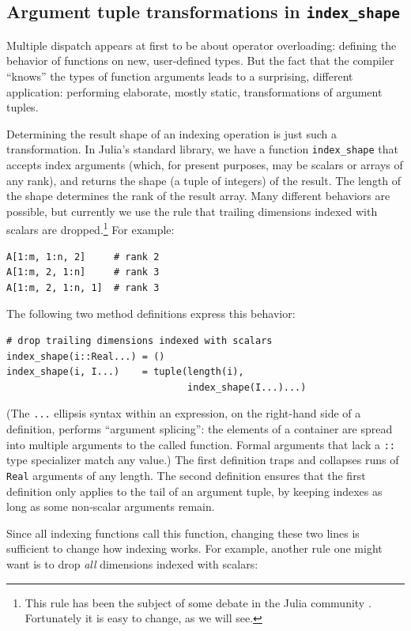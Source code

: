 \documentclass[preprint]{sigplanconf}
\newcommand{\code}[1]{\texttt{#1}}
\begin{document}
\subsection{Argument tuple transformations in \code{index\_shape}}

Multiple dispatch appears at first to be about operator overloading:
defining the behavior of functions on new, user-defined types.
But the fact that the compiler ``knows'' the types of function arguments leads
to a surprising, different application: performing elaborate, mostly static,
transformations of argument tuples.

Determining the result shape of an indexing operation is just such a
transformation. In Julia's standard library, we have a function
\code{index\_shape} that accepts index arguments (which, for present
purposes, may be scalars or arrays of any rank), and returns the
shape (a tuple of integers) of the result. The length of the shape
determines the rank of the result array. Many different behaviors
are possible, but currently we use the rule that trailing dimensions
indexed with scalars are dropped.\footnote{This rule has been the subject of
some debate in the Julia community \cite{issue5949}. Fortunately it is easy to change,
as we will see.}
For example:

\begin{verbatim}
A[1:m, 1:n, 2]     # rank 2
A[1:m, 2, 1:n]     # rank 3
A[1:m, 2, 1:n, 1]  # rank 3
\end{verbatim}

The following two method definitions express this behavior:

{\small
\begin{verbatim}
# drop trailing dimensions indexed with scalars
index_shape(i::Real...) = ()
index_shape(i, I...)    = tuple(length(i),
                                index_shape(I...)...)
\end{verbatim}
}
(The \code{...} ellipsis syntax within an expression, on the right-hand side of
a definition, performs ``argument splicing'': the elements of a container
are spread into multiple arguments to the called function. Formal
arguments that lack a \code{::} type specializer match any value.)
The first definition traps and collapses runs of \code{Real} arguments of
any length. The second definition ensures that the first definition only
applies to the tail of an argument tuple, by keeping indexes as long as
some non-scalar arguments remain.

Since all indexing functions call this function, changing these two lines is
sufficient to change how indexing works. For example, another rule one might
want is to drop \emph{all} dimensions indexed with scalars:
\end{document}
